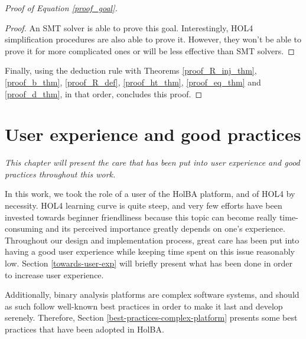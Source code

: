 \documentclass{kththesis}
\begin{document}
{\begin{proof}[Proof of Equation \ref{proof_goal}]
\begin{proof}
An \gls{SMT} solver is able to prove this goal. Interestingly, HOL4 simplification procedures are also able to prove it. However, they won't be able to prove it for more complicated ones or will be less effective than SMT solvers.
\end{proof} %

Finally, using the deduction rule with Theorems \ref{proof_R_inj_thm}, \ref{proof_b_thm}, \ref{proof_R_def}, \ref{proof_ht_thm}, \ref{proof_eq_thm} and \ref{proof_d_thm}, in that order, concludes this proof.
\renewcommand\qedsymbol{$\blacksquare$}
\end{proof}

\chapter{User experience and good practices} \label{user-friendliness}
\vspace{-1cm}
\textit{This chapter will present the care that has been put into user experience and good practices throughout this work.}

%


In this work, we took the role of a user of the HolBA platform, and of HOL4 by necessity. HOL4 learning curve is quite steep, and very few efforts have been invested towards beginner friendliness because this topic can become really time-consuming and its perceived importance greatly depends on one's experience. Throughout our design and implementation process, great care has been put into having a good user experience while keeping time spent on this issue reasonably low. Section \ref{towards-user-exp} will briefly present what has been done in order to increase user experience.

Additionally, binary analysis platforms are complex software systems, and should as such follow well-known best practices in order to make it last and develop serenely. Therefore, Section \ref{best-practices-complex-platform} presents some best practices that have been adopted in HolBA.

}
\end{document}
